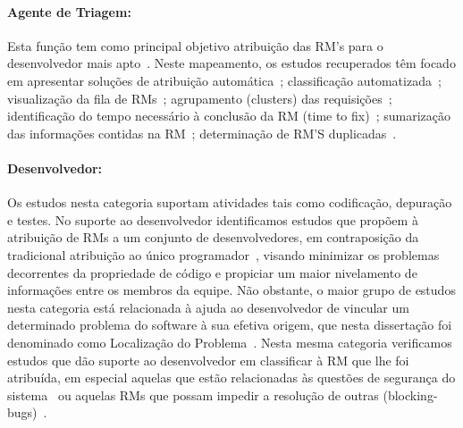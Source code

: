 \paragraph{Agente de Triagem:} Esta função tem como principal objetivo
atribuição das RM’s para o desenvolvedor mais apto~\cite{banitaan2013decoba}.
Neste mapeamento, os estudos recuperados têm focado em apresentar soluções de
atribuição automática~\cite{banitaan2013decoba, shokripour2012automatic,
	somasundaram2012automatic, Naguib2013, Zhang2014, Zanetti2013};
classificação automatizada~\cite{gegick2010identifying,liu2014faceted,
	behl2014bug, chawla2015automated,tian2015automated}; visualização da fila de
RMs~\cite{izquierdo2015gila}; agrupamento (clusters) das
requisições~\cite{liu2014faceted}; identificação do tempo necessário à conclusão
da RM (time to fix)~\cite{hosseini2012market,
	Bhattacharya:2011:BTP:1985441.1985472}; sumarização das informações contidas
na RM~\cite{mani2012ausum}; determinação de RM'S duplicadas~\cite{Sun2011,
	Wu2011a}.


\paragraph{Desenvolvedor:} Os estudos nesta categoria suportam atividades tais
como co\-di\-fi\-ca\-ção, depuração e testes. No suporte ao desenvolvedor
identificamos estudos que propõem à atribuição de RMs a um conjunto de
desenvolvedores, em contraposição da tradicional atribuição ao único
programador~\cite{banitaan2013decoba}, visando  minimizar os pro\-ble\-mas
decorrentes da propriedade de código e propiciar um maior nivelamento de
informações entre os membros da equipe. Não obstante, o maior grupo de estudos
nesta categoria está relacionada à ajuda ao desenvolvedor de vincular um
determinado problema do software à sua efetiva origem, que nesta dissertação foi
denominado como Localização do
Problema~\cite{corley2011recovering,Wong:2014:BBF:2705615.2706096,
	Thung:2014:BIT:2635868.2661678,Nguyen:2012:MAR:2393596.2393671,thung2013automatic,
	Romo:2015:TAT:2745802.2745833}. Nesta mesma categoria verificamos estudos
que dão suporte ao desenvolvedor em classificar à RM que lhe foi atribuída, em
especial aquelas que estão relacionadas às questões de segurança do
sistema~\cite{gegick2010identifying} ou aquelas RMs que possam impedir a
resolução de outras
(blocking-bugs)~\cite{ValdiviaGarcia:2014:CPB:2597073.2597099}.

